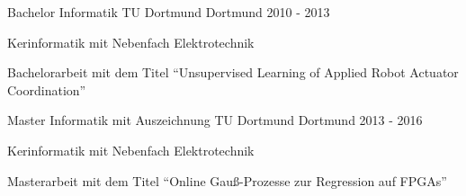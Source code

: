 

\begin{cventries}


\cventry
{Bachelor Informatik} %
{TU Dortmund} %
{Dortmund} %
{2010 - 2013} %
{
    \begin{cvitems} %
        \item Kerinformatik mit Nebenfach Elektrotechnik
        \item Bachelorarbeit mit dem Titel ``Unsupervised Learning of Applied Robot Actuator Coordination''
    \end{cvitems}
}

\cventry
{Master Informatik mit Auszeichnung} %
{TU Dortmund} %
{Dortmund} %
{2013 - 2016} %
{
    \begin{cvitems} %
        \item Kerinformatik mit Nebenfach Elektrotechnik
        \item Masterarbeit mit dem Titel ``Online Gau{\ss}-Prozesse zur Regression auf FPGAs''
    \end{cvitems}
}

\end{cventries}
